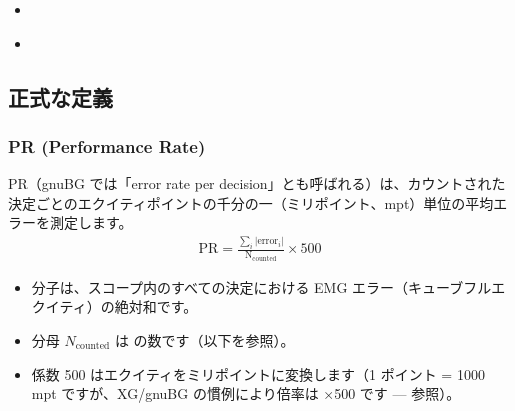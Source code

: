 \documentclass[letterpaper,10pt,dvipdfmx]{sphinxmanual}
\begin{document}
\begin{sphinxcontents}
\begin{itemize}
\begin{itemize}
\item {} 
\sphinxAtStartPar
{}\label{\detokenize{stats_parity:id12}}{\hyperref[\detokenize{stats_parity:comparaison-gnubg-blunderdb-import-sgf-moteurs-differents}]{}}

\end{itemize}

\item {} 
\sphinxAtStartPar
{}\label{\detokenize{stats_parity:id13}}{\hyperref[\detokenize{stats_parity:valider-vos-propres-chiffres}]{}}

\item {} 
\sphinxAtStartPar
{}\label{\detokenize{stats_parity:id14}}{\hyperref[\detokenize{stats_parity:reference-gnubg}]{}}

\end{itemize}
\end{sphinxcontents}


\subsection{正式な定義}
\label{\detokenize{stats_parity:definitions-formelles}}

\subsubsection{PR (Performance Rate)}
\label{\detokenize{stats_parity:pr-performance-rate}}
\sphinxAtStartPar
PR（gnuBG では「error rate per decision」とも呼ばれる）は、カウントされた決定ごとのエクイティポイントの千分の一（ミリポイント、mpt）単位の平均エラーを測定します。
\begin{equation*}
\begin{split}\mathrm{PR} = \frac{\sum_i |\mathrm{error}_i|}{\mathrm{N_{counted}}} \times 500\end{split}
\end{equation*}\begin{itemize}
\item {} 
\sphinxAtStartPar
分子は、スコープ内のすべての決定における EMG エラー（キューブフルエクイティ）の絶対和です。

\item {} 
\sphinxAtStartPar
分母 \(N_\text{counted}\) は  の数です（以下を参照）。

\item {} 
\sphinxAtStartPar
係数 500 はエクイティをミリポイントに変換します（1 ポイント = 1000 mpt ですが、XG/gnuBG の慣例により倍率は ×500 です —  参照）。

\end{itemize}
\end{document}
